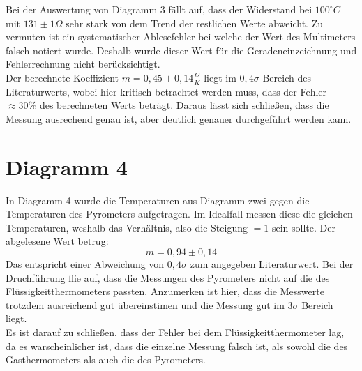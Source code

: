 Bei der Auswertung von Diagramm 3 fällt auf, dass der Widerstand bei $100 ^\circ C$ mit $131 \pm 1 \Omega$
sehr stark von dem Trend der restlichen Werte abweicht. Zu vermuten ist ein systematischer Ablesefehler
bei welche der Wert des Multimeters falsch notiert wurde. Deshalb wurde dieser Wert für die Geradeneinzeichnung und Fehlerrechnung nicht berücksichtigt.\\
Der berechnete Koeffizient $m = 0,45 \pm 0,14  \tfrac{\Omega}{K}$ liegt im $0,4 \sigma$ Bereich des Literaturwerts, wobei hier kritisch betrachtet werden muss,
dass der Fehler $\approx 30 \% $ des berechneten Werts beträgt.
Daraus lässt sich schließen, dass die Messung ausrechend genau ist, aber deutlich genauer durchgeführt werden kann.


\section{Diagramm 4}

In Diagramm 4 wurde die Temperaturen aus Diagramm zwei gegen die Temperaturen des Pyrometers aufgetragen. Im Idealfall messen diese die
gleichen Temperaturen, weshalb das Verhältnis, also die Steigung $= 1$ sein sollte.
Der abgelesene Wert betrug:
\[ m = 0,94 \pm 0,14\]
Das entspricht einer Abweichung von $0,4 \sigma$ zum angegeben Literaturwert.
Bei der Druchführung flie auf, dass die Messungen des Pyrometers nicht auf die des Flüssigkeitthermometers passten.
Anzumerken ist hier, dass die Messwerte trotzdem ausreichend gut übereinstimen und die Messung gut im $3 \sigma$ Bereich liegt.
\\
Es ist darauf zu schließen, dass der Fehler bei dem Flüssigkeitthermometer lag, da es warscheinlicher ist, dass die einzelne Messung falsch ist,
als sowohl die des Gasthermometers als auch die des Pyrometers.



